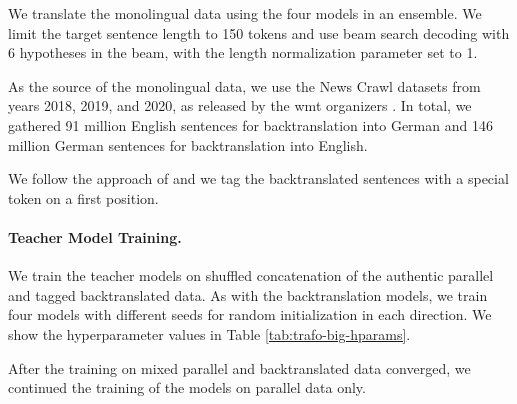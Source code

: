 We translate the monolingual data using the four models in an ensemble. We
limit the target sentence length to 150 tokens and use beam search decoding
with 6 hypotheses in the beam, with the length normalization parameter set to
1.

As the source of the monolingual data, we use the News Crawl datasets from
years 2018, 2019, and 2020, as released by the \acs{wmt} organizers
\citep{bojar-etal-2018-findings,barrault-etal-2019-findings,
  barrault-etal-2020-findings}. In total, we gathered 91 million English
sentences for backtranslation into German and 146 million German sentences for
backtranslation into English.

We follow the approach of \citet{caswell-etal-2019-tagged} and we tag the
backtranslated sentences with a special token on a first position.


\paragraph{Teacher Model Training.}  We train the teacher models on shuffled
concatenation of the authentic parallel and tagged backtranslated data. As with
the backtranslation models, we train four models with different seeds for
random initialization in each direction. We show the hyperparameter values in
Table \ref{tab:trafo-big-hparams}.

After the training on mixed parallel and backtranslated data converged, we
continued the training of the models on parallel data only.

